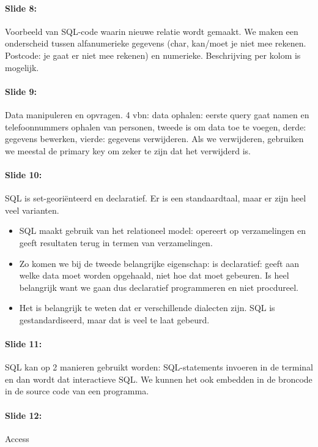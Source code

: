 \documentclass[10pt,a4paper]{report}
\begin{document}
\paragraph{Slide 8:}Voorbeeld van SQL-code waarin nieuwe relatie wordt gemaakt. We maken een onderscheid tussen alfanumerieke gegevens (char, kan/moet je niet mee rekenen. Postcode: je gaat er niet mee rekenen) en numerieke. Beschrijving per kolom is mogelijk.

\paragraph{Slide 9:}Data manipuleren en opvragen. 4 vbn: data ophalen: eerste query gaat namen en telefoonnummers ophalen van personen, tweede is om data toe te voegen, derde: gegevens bewerken, vierde: gegevens verwijderen. Als we verwijderen, gebruiken we meestal de primary key om zeker te zijn dat het verwijderd is.

\paragraph{Slide 10:}SQL is set-georiënteerd en declaratief. Er is een standaardtaal, maar er zijn heel veel varianten. 
\begin{itemize}
\item SQL maakt gebruik van het relationeel model: opereert op verzamelingen en geeft resultaten terug in termen van verzamelingen. 
\item Zo komen we bij de tweede belangrijke eigenschap: is declaratief: geeft aan welke data moet worden opgehaald, niet hoe dat moet gebeuren. Is heel belangrijk want we gaan dus declaratief programmeren en niet procdureel. 
\item Het is belangrijk te weten dat er verschillende dialecten zijn. SQL is gestandardiseerd, maar dat is veel te laat gebeurd.
\end{itemize}

\paragraph{Slide 11:}SQL kan op 2 manieren gebruikt worden: SQL-statements invoeren in de terminal en dan wordt dat interactieve SQL. We kunnen het ook embedden in de broncode in de source code van een programma.

\paragraph{Slide 12:}Access
\end{document}
